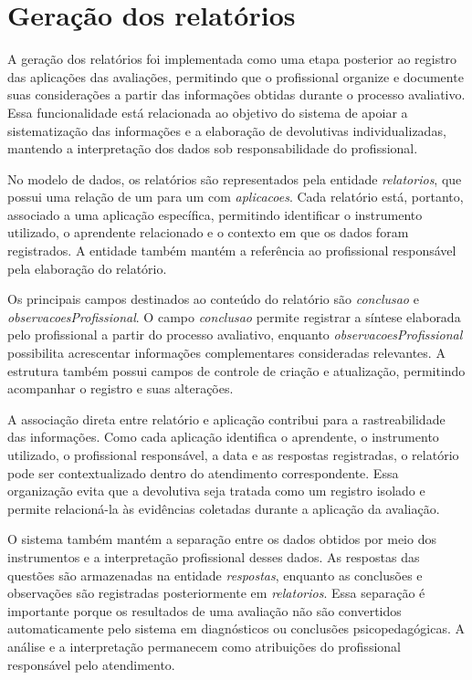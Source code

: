 \chapter[Geração dos relatórios]{Geração dos relatórios} \label{capitulo12}

A geração dos relatórios foi implementada como uma etapa posterior ao registro das aplicações das avaliações, permitindo que o profissional organize e documente suas considerações a partir das informações obtidas durante o processo avaliativo. Essa funcionalidade está relacionada ao objetivo do sistema de apoiar a sistematização das informações e a elaboração de devolutivas individualizadas, mantendo a interpretação dos dados sob responsabilidade do profissional.

No modelo de dados, os relatórios são representados pela entidade \textit{relatorios}, que possui uma relação de um para um com \textit{aplicacoes}. Cada relatório está, portanto, associado a uma aplicação específica, permitindo identificar o instrumento utilizado, o aprendente relacionado e o contexto em que os dados foram registrados. A entidade também mantém a referência ao profissional responsável pela elaboração do relatório.

Os principais campos destinados ao conteúdo do relatório são \textit{conclusao} e \textit{observacoesProfissional}. O campo \textit{conclusao} permite registrar a síntese elaborada pelo profissional a partir do processo avaliativo, enquanto \textit{observacoesProfissional} possibilita acrescentar informações complementares consideradas relevantes. A estrutura também possui campos de controle de criação e atualização, permitindo acompanhar o registro e suas alterações.

A associação direta entre relatório e aplicação contribui para a rastreabilidade das informações. Como cada aplicação identifica o aprendente, o instrumento utilizado, o profissional responsável, a data e as respostas registradas, o relatório pode ser contextualizado dentro do atendimento correspondente. Essa organização evita que a devolutiva seja tratada como um registro isolado e permite relacioná-la às evidências coletadas durante a aplicação da avaliação.

O sistema também mantém a separação entre os dados obtidos por meio dos instrumentos e a interpretação profissional desses dados. As respostas das questões são armazenadas na entidade \textit{respostas}, enquanto as conclusões e observações são registradas posteriormente em \textit{relatorios}. Essa separação é importante porque os resultados de uma avaliação não são convertidos automaticamente pelo sistema em diagnósticos ou conclusões psicopedagógicas. A análise e a interpretação permanecem como atribuições do profissional responsável pelo atendimento.

